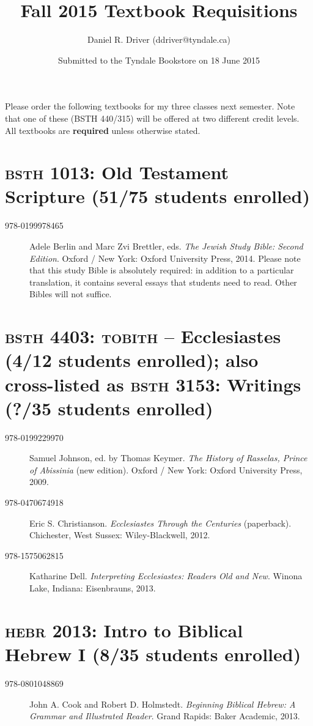 \documentclass[11pt]{article}
\title{Fall 2015 Textbook Requisitions}
\author{Daniel R. Driver (ddriver@tyndale.ca)}
\date{Submitted to the Tyndale Bookstore on 18 June 2015}
\begin{document}
\maketitle

Please order the following textbooks for my three classes next semester.
Note that one of these (BSTH 440/315) will be offered at two different
credit levels. All textbooks are \textbf{required} unless otherwise
stated.

\section{\textsc{bsth} 1013: Old Testament Scripture (51/75 students enrolled)}

\begin{description}

	\item[978-0199978465] Adele Berlin and Marc Zvi Brettler, eds.
    \emph{The Jewish Study Bible: Second Edition}.
    Oxford / New York: Oxford University Press, 2014.
    Please note that this study Bible is absolutely required: in
    addition to a particular translation, it contains several essays
    that students need to read. Other Bibles will not suffice.

\end{description}

\section{\textsc{bsth} 4403: \textsc{tobith} -- Ecclesiastes (4/12 students enrolled);
also cross-listed as \textsc{bsth} 3153: Writings (?/35 students enrolled)}

\begin{description}

	\item[978-0199229970] Samuel Johnson, ed. by Thomas Keymer.
	\emph{The History of Rasselas, Prince of Abissinia} (new edition).
	Oxford / New York: Oxford University Press, 2009.

	\item[978-0470674918] Eric S. Christianson.
    \emph{Ecclesiastes Through the Centuries} (paperback).
    Chichester, West Sussex: Wiley-Blackwell, 2012.

	\item[978-1575062815] Katharine Dell.
	\emph{Interpreting Ecclesiastes: Readers Old and New}.
	Winona Lake, Indiana: Eisenbrauns, 2013.

\end{description}

\section{\textsc{hebr} 2013: Intro to Biblical Hebrew I (8/35 students enrolled)}

\begin{description}

	\item[978-0801048869] John A. Cook and Robert D. Holmstedt.
	\emph{Beginning Biblical Hebrew: A Grammar and Illustrated Reader}.
	Grand Rapids: Baker Academic, 2013.

\end{description}
\end{document}
